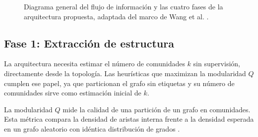 \documentclass[twoside,twocolumn,10pt]{article}
\begin{document}
\begin{figure}[t]
{
}
\caption{Diagrama general del flujo de información y las cuatro fases de la arquitectura propuesta, adaptada del marco de Wang et al. \cite{Wang2025}.}
\label{fig:pipeline-arquitectura}
\end{figure}

\subsection{Fase 1: Extracción de estructura}
\label{sec:fase-1}

La arquitectura necesita estimar el número de comunidades $k$ sin supervisión, directamente desde la topología. Las heurísticas que maximizan la modularidad $Q$ cumplen ese papel, ya que particionan el grafo sin etiquetas y su número de comunidades sirve como estimación inicial de $k$.

La modularidad $Q$ mide la calidad de una partición de un grafo en comunidades. Esta métrica compara la densidad de aristas interna frente a la densidad esperada en un grafo aleatorio con idéntica distribución de grados \cite{Newman2004}.
\end{document}
